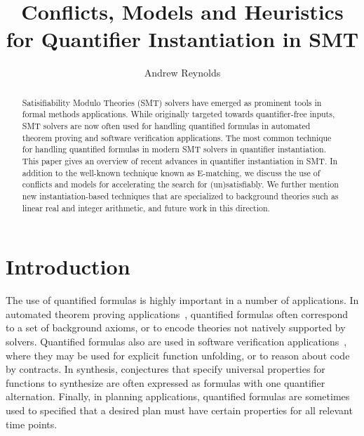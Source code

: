 \documentclass[oribibl]{llncs}
\begin{document}
\title{Conflicts, Models and Heuristics for Quantifier Instantiation in SMT}

\author {Andrew Reynolds}

\maketitle

\pagestyle{plain}

\begin{abstract}
Satisifiability Modulo Theories (SMT) solvers have
emerged as prominent tools in formal methods applications.
While originally targeted towards quantifier-free inputs,
SMT solvers are now often used for handling quantified formulas in automated
theorem proving and software verification applications.
The most common technique for handling quantified formulas in modern SMT solvers
in quantifier instantiation.
This paper gives an overview of recent advances in quantifier instantiation in SMT.
In addition to the well-known technique known as E-matching,
we discuss the use of conflicts and models for 
accelerating the search for (un)satisfiably.
We further mention new instantiation-based techniques
that are specialized to background theories such as linear real and integer arithmetic,
and future work in this direction.
\end{abstract}

\section{Introduction}

The use of quantified formulas is highly important in a number of applications.
In automated theorem proving applications~\cite{blanchette2013extending,bobot2011why3},
quantified formulas often correspond to a set of background axioms,
or to encode theories not natively supported by solvers.
Quantified formulas also are used in software verification applications~\cite{DBLP:conf/icse/Leino04,DBLP:conf/itp/ChapmanS14},
where they may be used for explicit function unfolding, or to reason about code by contracts.
In synthesis, conjectures that specify universal properties for functions to synthesize are often expressed as formulas
with one quantifier alternation.
Finally, in planning applications, quantified formulas are sometimes used to specified
that a desired plan must have certain properties for all relevant time points.
\end{document}
